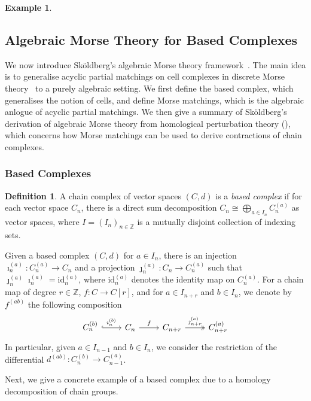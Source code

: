 \documentclass[11pt, table, nothms]{amsart}
\theoremstyle{definition}
\newtheorem{example}[theorem]{Example}
\newtheorem{definition}[theorem]{Definition}
\newcommand{\Z}{\mathbb{Z}}
\newcommand{\id}{\mathrm{id}}
\begin{document}
{\begin{example}
\end{example}


\subsection{Algebraic Morse Theory for Based Complexes}\label{ssec:AMT}

We now introduce Sk\"oldberg's algebraic Morse theory framework~\cite{Skoldberg2006MorseViewpoint}. The main idea is to generalise acyclic partial matchings on cell complexes in discrete Morse theory~\cite{Forman1998MorseComplexes} to a purely algebraic setting. We first define the based complex, which generalises the notion of cells, and define Morse matchings, which is the algebraic anlogue of acyclic partial matchings. We then give a summary of Sk\"oldberg's derivation of algebraic Morse theory from homological perturbation theory (\cite{Skoldberg2018}), which concerns how Morse matchings can be used to derive contractions of chain complexes. 

\subsubsection{Based Complexes}
\begin{definition}
   A chain complex of vector spaces $(C, d)$ is a \emph{based complex} if for each vector space $C_n$, there is a direct sum decomposition $C_n \cong  \bigoplus_{a \in I_n} C_n^{(a)}$ as vector spaces, where $I = (I_n)_{n \in \Z}$ is a mutually disjoint collection of indexing sets.  
\end{definition}
Given a based complex $(C,d)$ for $a \in I_n$, there is an injection $\imath_n^{(a)} \colon C_n^{(a)} \to C_n$ and a projection $\jmath_n^{(a)} \colon C_n \to C_n^{(a)}$ such that $\jmath_n^{(a)} \imath_n^{(a)} = \id_n^{(a)}$, where $\id_n^{(a)}$ denotes the identity map on $C_n^{(a)}$. For a chain map of degree $r\in \Z$, $f\colon C \to C[r]$, and for $a \in I_{n+r}$ and $b \in I_{n}$, we denote by $f^{(a b)}$ the following composition
\[
\begin{tikzcd}
C_n^{(b)} \ar[r, "\imath_n^{(b)}", hookrightarrow] &
C_n \ar[r, "f"] &
C_{n+r} \ar[r, "\jmath_{n+r}^{(a)}", twoheadrightarrow] &
C_{n+r}^{(a)} 
\end{tikzcd}
\]
In particular, given $a \in I_{n-1}$ and $b \in I_n$, we consider the restriction of the differential $d^{(ab)}: C^{(b)}_{n} \to C^{(a)}_{n-1}$. 

Next, we give a concrete example of a based complex due to a homology decomposition of chain groups. 

}
\end{document}
